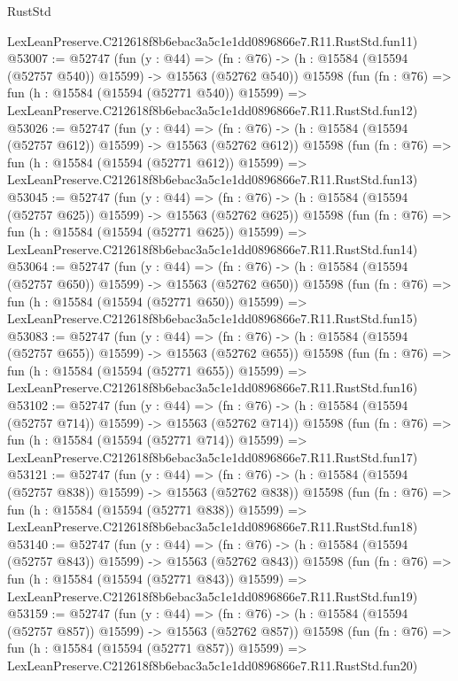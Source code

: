 \begin{lexlean}{RustStd}
\begin{coremodule}
    LexLeanPreserve.C212618f8b6ebac3a5c1e1dd0896866e7.R11.RustStd.fun11)
@53007 := @52747
    (fun (y : @44) =>
    (fn : @76) -> (h : @15584 (@15594 (@52757 @540)) @15599) -> @15563 (@52762 @540))
    @15598
    (fun (fn : @76) =>
    fun (h : @15584 (@15594 (@52771 @540)) @15599) =>
    LexLeanPreserve.C212618f8b6ebac3a5c1e1dd0896866e7.R11.RustStd.fun12)
@53026 := @52747
    (fun (y : @44) =>
    (fn : @76) -> (h : @15584 (@15594 (@52757 @612)) @15599) -> @15563 (@52762 @612))
    @15598
    (fun (fn : @76) =>
    fun (h : @15584 (@15594 (@52771 @612)) @15599) =>
    LexLeanPreserve.C212618f8b6ebac3a5c1e1dd0896866e7.R11.RustStd.fun13)
@53045 := @52747
    (fun (y : @44) =>
    (fn : @76) -> (h : @15584 (@15594 (@52757 @625)) @15599) -> @15563 (@52762 @625))
    @15598
    (fun (fn : @76) =>
    fun (h : @15584 (@15594 (@52771 @625)) @15599) =>
    LexLeanPreserve.C212618f8b6ebac3a5c1e1dd0896866e7.R11.RustStd.fun14)
@53064 := @52747
    (fun (y : @44) =>
    (fn : @76) -> (h : @15584 (@15594 (@52757 @650)) @15599) -> @15563 (@52762 @650))
    @15598
    (fun (fn : @76) =>
    fun (h : @15584 (@15594 (@52771 @650)) @15599) =>
    LexLeanPreserve.C212618f8b6ebac3a5c1e1dd0896866e7.R11.RustStd.fun15)
@53083 := @52747
    (fun (y : @44) =>
    (fn : @76) -> (h : @15584 (@15594 (@52757 @655)) @15599) -> @15563 (@52762 @655))
    @15598
    (fun (fn : @76) =>
    fun (h : @15584 (@15594 (@52771 @655)) @15599) =>
    LexLeanPreserve.C212618f8b6ebac3a5c1e1dd0896866e7.R11.RustStd.fun16)
@53102 := @52747
    (fun (y : @44) =>
    (fn : @76) -> (h : @15584 (@15594 (@52757 @714)) @15599) -> @15563 (@52762 @714))
    @15598
    (fun (fn : @76) =>
    fun (h : @15584 (@15594 (@52771 @714)) @15599) =>
    LexLeanPreserve.C212618f8b6ebac3a5c1e1dd0896866e7.R11.RustStd.fun17)
@53121 := @52747
    (fun (y : @44) =>
    (fn : @76) -> (h : @15584 (@15594 (@52757 @838)) @15599) -> @15563 (@52762 @838))
    @15598
    (fun (fn : @76) =>
    fun (h : @15584 (@15594 (@52771 @838)) @15599) =>
    LexLeanPreserve.C212618f8b6ebac3a5c1e1dd0896866e7.R11.RustStd.fun18)
@53140 := @52747
    (fun (y : @44) =>
    (fn : @76) -> (h : @15584 (@15594 (@52757 @843)) @15599) -> @15563 (@52762 @843))
    @15598
    (fun (fn : @76) =>
    fun (h : @15584 (@15594 (@52771 @843)) @15599) =>
    LexLeanPreserve.C212618f8b6ebac3a5c1e1dd0896866e7.R11.RustStd.fun19)
@53159 := @52747
    (fun (y : @44) =>
    (fn : @76) -> (h : @15584 (@15594 (@52757 @857)) @15599) -> @15563 (@52762 @857))
    @15598
    (fun (fn : @76) =>
    fun (h : @15584 (@15594 (@52771 @857)) @15599) =>
    LexLeanPreserve.C212618f8b6ebac3a5c1e1dd0896866e7.R11.RustStd.fun20)

\end{coremodule}
\end{lexlean}
